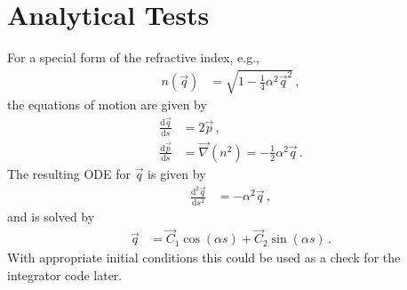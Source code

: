 \documentclass[12pt,a4paper,twoside,openright,BCOR10mm,headsepline,titlepage,abstracton,chapterprefix,final]{scrreprt}
\begin{document}
\section{Analytical Tests}

For a special form of the refractive index, e.g.,
\begin{align}
 n(\vec{q}) &= \sqrt{1 - \frac{1}{4} \alpha^2 \vec{q}^2}\,,
\end{align}
the equations of motion are given by
\begin{align}
 \frac{\text{d}\vec{q}}{\text{d}s} &=  2 \vec{p}\,,\\
 \frac{\text{d}\vec{p}}{\text{d}s} &= \vec{\nabla}(n^2) = -\frac{1}{2}\alpha^2 \vec{q}\,. 
\end{align}
The resulting ODE for $\vec{q}$ is given by
\begin{align}
 \frac{\text{d}^2\vec{q}}{\text{d}s^2} &= -\alpha^2 \vec{q}\,,
\end{align}
and is solved by
\begin{align}
 \vec{q} &= \vec{C}_1 \cos(\alpha s) + \vec{C}_2 \sin(\alpha s)\,.
\end{align}
With appropriate initial conditions this could be used as a check for the integrator code later.
\end{document}
